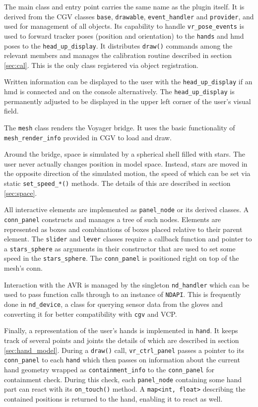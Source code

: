\documentclass[hyperref, bachelorofscience]{cgvpub}
\begin{document}
The main class and entry point carries the same name as the plugin itself. It is derived from the \gls{CGV} classes \lstinline|base|, \lstinline|drawable|, \lstinline|event_handler| and \lstinline|provider|, and used for management of all objects. Its capability to handle \lstinline|vr_pose_events| is used to forward tracker poses (position and orientation) to the \lstinline|hands| and \acrshort{hmd} poses to the \lstinline|head_up_display|. It distributes \lstinline|draw()| commands among the relevant members and manages the calibration routine described in section \ref{sec:cal}. This is the only class registered via object registration.

Written information can be displayed to the user with the \lstinline|head_up_display| if an \acrshort{hmd} is connected and on the console alternatively. The \lstinline|head_up_display| is permanently adjusted to be displayed in the upper left corner of the user's visual field.

The \lstinline|mesh| class renders the Voyager bridge. It uses the basic functionality of \lstinline|mesh_render_info| provided in \gls{CGV} to load and draw.

Around the bridge, space is simulated by a spherical shell filled with stars. The user never actually changes position in model space. Instead, stars are moved in the opposite direction of the simulated motion, the speed of which can be set via static \lstinline|set_speed_*()| methods. The details of this are described in section \ref{sec:space}.

All interactive elements are implemented as \lstinline|panel_node| or its derived classes. A \lstinline|conn_panel| constructs and manages a tree of such nodes. Elements are represented as boxes and combinations of boxes placed relative to their parent element. The \lstinline|slider| and \lstinline|lever| classes require a callback function and pointer to a \lstinline|stars_sphere| as arguments in their constructor that are used to set some speed in the \lstinline|stars_sphere|. The \lstinline|conn_panel| is positioned right on top of the mesh's conn.

Interaction with the \Gls{AVR} is managed by the singleton \lstinline|nd_handler| which can be used to pass function calls through to an instance of \lstinline|NDAPI|. This is frequently done in \lstinline|nd_device|, a class for querying sensor data from the gloves and converting it for better compatibility with \lstinline|cgv| and \gls{VCP}.

Finally, a representation of the user's hands is implemented in \lstinline|hand|. It keeps track of several points and joints the details of which are described in section \ref{sec:hand_model}. During a \lstinline|draw()| call, \lstinline|vr_ctrl_panel| passes a pointer to its \lstinline|conn_panel| to each \lstinline|hand| which then passes on information about the current hand geometry wrapped as \lstinline|containment_info| to the \lstinline|conn_panel| for containment check. During this check, each \lstinline|panel_node| containing some hand part can react with its \lstinline|on_touch()| method. A \lstinline|map<int, float>| describing the contained positions is returned to the hand, enabling it to react as well.
\end{document}

